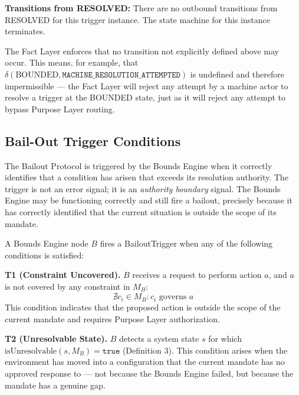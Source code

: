 \bigskip

\textbf{Transitions from RESOLVED:} There are no outbound transitions from RESOLVED for this trigger instance. The state machine for this instance terminates.

\bigskip

The Fact Layer enforces that no transition not explicitly defined above may occur. This means, for example, that $\delta(\text{BOUNDED}, \texttt{MACHINE\_RESOLUTION\_ATTEMPTED})$ is undefined and therefore impermissible --- the Fact Layer will reject any attempt by a machine actor to resolve a trigger at the BOUNDED state, just as it will reject any attempt to bypass Purpose Layer routing.

\subsection{Bail-Out Trigger Conditions}
\label{sec:trigger-conditions}

The Bailout Protocol is triggered by the Bounds Engine when it correctly identifies that a condition has arisen that exceeds its resolution authority. The trigger is not an error signal; it is an \textit{authority boundary} signal. The Bounds Engine may be functioning correctly and still fire a bailout, precisely because it has correctly identified that the current situation is outside the scope of its mandate.

\bigskip

A Bounds Engine node $B$ fires a BailoutTrigger when any of the following conditions is satisfied:

\bigskip

\noindent\textbf{T1 (Constraint Uncovered).} $B$ receives a request to perform action $a$, and $a$ is not covered by any constraint in $M_B$:
\begin{equation}
\nexists c_i \in M_B : c_i \text{ governs } a
\end{equation}
This condition indicates that the proposed action is outside the scope of the current mandate and requires Purpose Layer authorization.

\bigskip

\noindent\textbf{T2 (Unresolvable State).} $B$ detects a system state $s$ for which $\text{isUnresolvable}(s, M_B) = \texttt{true}$ (Definition 3). This condition arises when the environment has moved into a configuration that the current mandate has no approved response to --- not because the Bounds Engine failed, but because the mandate has a genuine gap.

